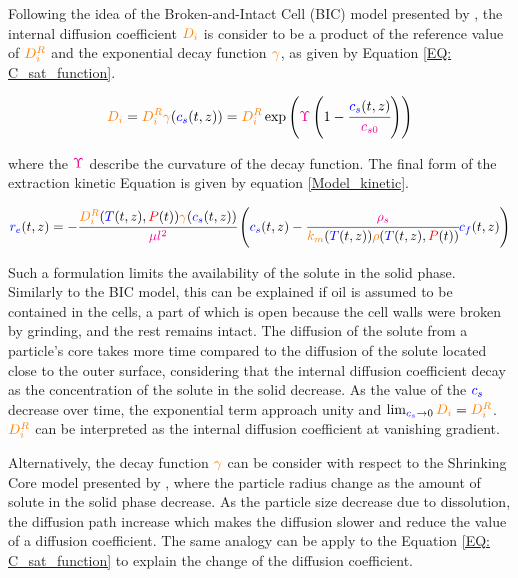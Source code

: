 \documentclass[../Article_Model_Parameters.tex]{subfiles}
\begin{document}
	Following the idea of the Broken-and-Intact Cell (BIC) model presented by \citet{Sovova2017}, the internal diffusion coefficient ${\color{orange}D_i}$ is consider to be a product of the reference value of ${\color{orange}D_i^R}$ and the exponential decay function ${\color{orange} \gamma}$, as given by Equation \ref{EQ: C_sat_function}.
		
	{\footnotesize
		\begin{equation}
			{\color{orange}D_i} = {\color{orange}D_i^R} {\color{orange} \gamma}({\color{blue} c_s} (t,z)) = {\color{orange}D_i^R} \exp\left( {\color{magenta}\Upsilon} \left( 1-\cfrac{{\color{blue} c_s} (t,z) }{{\color{magenta}c_{s0}}} \right) \right) \label{EQ: C_sat_function}
		\end{equation} }
	
	where the ${\color{magenta}\Upsilon}$ describe the curvature of the decay function. The final form of the extraction kinetic Equation is given by equation \ref{Model_kinetic}.
			
	{\scriptsize
		\begin{equation}
			\label{Model_kinetic}
				{\color{blue}r_e}(t,z) = -\cfrac{{\color{orange}D_i^R}({\color{blue}T}(t,z), {\color{red}P}(t)) {\color{orange} \gamma}({\color{blue} c_s} (t,z)) }{{\color{magenta} \mu l^2} } \left({\color{blue}{\color{blue} c_s} }(t,z)  - \cfrac{{\color{magenta}\rho_s}}{{\color{orange}k_m}({\color{blue}T}(t,z)){\color{orange}\rho}({\color{blue}T}(t,z),{\color{red}P}(t))}  {\color{blue}c_f}(t,z) \right)
		\end{equation} }
	
	Such a formulation limits the availability of the solute in the solid phase. Similarly to the BIC model, this can be explained if oil is assumed to be contained in the cells, a part of which is open because the cell walls were broken by grinding, and the rest remains intact. The diffusion of the solute from a particle's core takes more time compared to the diffusion of the solute located close to the outer surface, considering that the internal diffusion coefficient decay as the concentration of the solute in the solid decrease. As the value of the ${\color{blue}c_s}$ decrease over time, the exponential term approach unity and $\lim_{ {\color{blue}c_s} \rightarrow 0} {\color{orange}D_i} =  {\color{orange}D_i^R}$. ${\color{orange}D_i^R}$ can be interpreted as the internal diffusion coefficient at vanishing gradient. 
		
	Alternatively, the decay function ${\color{orange}\gamma}$ can be consider with respect to the Shrinking Core model presented by \citet{Goto1996}, where the particle radius change as the amount of solute in the solid phase decrease. As the particle size decrease due to dissolution, the diffusion path increase which makes the diffusion slower and reduce the value of a diffusion coefficient. The same analogy can be apply to the Equation \ref{EQ: C_sat_function} to explain the change of the diffusion coefficient.
		
\end{document}
